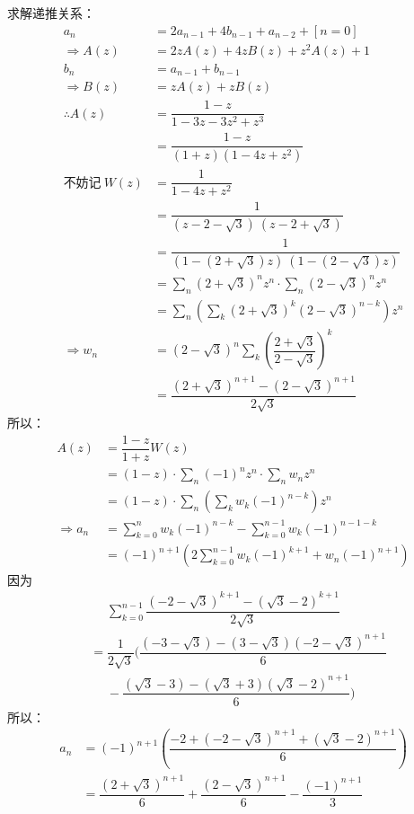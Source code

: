 求解递推关系：
\begin{align*}
  a_n &= 2 a_{n-1} + 4 b_{n-1} + a_{n-2} + [n=0] \\
  \Rightarrow A(z) &= 2 z A(z) + 4 z B(z) + z^2 A(z) + 1 \\
  b_n &= a_{n-1} + b_{n-1} \\
  \Rightarrow B(z) &= z A(z) + z B(z) \\
  \therefore A(z) &= \dfrac{1-z}{1-3z-3z^2+z^3} \\
  &= \dfrac{1-z}{(1+z)(1-4z+z^2)} \\
  \text{不妨记} \ W(z) &= \dfrac{1}{1-4z+z^2} \\
  &= \dfrac{1}{(z-2-\sqrt{3}) \ (z-2+\sqrt{3})} \\
  &= \dfrac{1}{(1-(2+\sqrt{3})z) \ (1-(2-\sqrt{3})z)} \\[6pt]
  &= \sum_n (2+\sqrt{3})^n z^n \cdot \sum_n (2-\sqrt{3})^n z^n \\
  &= \sum_n \left( \sum_k (2+\sqrt{3})^k (2-\sqrt{3})^{n-k} \right) z^n \\
  \Rightarrow w_n &= (2-\sqrt{3})^n \sum_k (\dfrac{2+\sqrt{3}}{2-\sqrt{3}})^k \\
  &= \dfrac{(2+\sqrt{3})^{n+1} - (2-\sqrt{3})^{n+1}}{2\sqrt{3}}
\end{align*}
所以：
\begin{align*}
  A(z) &= \dfrac{1-z}{1+z} W(z) \\
  &= (1-z) \cdot \sum_n (-1)^n z^n \cdot \sum_n w_n z^n \\
  &= (1-z) \cdot \sum_n \left(\sum_k w_k (-1)^{n-k} \right) z^n \\
  \Rightarrow a_n &= \sum_{k=0}^n w_k (-1)^{n-k} - \sum_{k=0}^{n-1} w_k (-1)^{n-1-k} \\
  &= (-1)^{n+1} \left(2 \sum_{k=0}^{n-1} w_k (-1)^{k+1} + w_n (-1)^{n+1} \right)
\end{align*}
因为
\begin{align*}
  &\phantom{=} \sum_{k=0}^{n-1} \dfrac{(-2-\sqrt{3})^{k+1} - (\sqrt{3} - 2)^{k+1}}{2\sqrt{3}} \\
  &= \dfrac{1}{2\sqrt{3}} ( \dfrac{(-3-\sqrt{3}) - (3-\sqrt{3})(-2-\sqrt{3})^{n+1}}{6} \\
  &\phantom{=} - \dfrac{(\sqrt{3}-3) - (\sqrt{3} + 3)(\sqrt{3} - 2)^{n+1}}{6} )
\end{align*}
所以：
\begin{align*}
  a_n &= (-1)^{n+1} \left(\dfrac{-2 + (-2-\sqrt{3})^{n+1} + (\sqrt{3} - 2)^{n+1}}{6} \right) \\
  &= \dfrac{(2+\sqrt{3})^{n+1}}{6} + \dfrac{(2-\sqrt{3})^{n+1}}{6} - \dfrac{(-1)^{n+1}}{3}
\end{align*}


